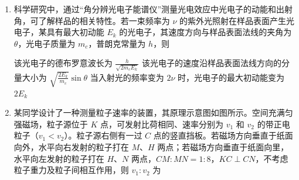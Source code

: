 \documentclass[\gkver]{gaokaozhenti}
\begin{document}
\begin{enumerate}
{已知光进入棱镜后垂直射到镜面 $MN$ 上，可得棱镜内的折射角：$r=90^{\circ}-60^{\circ}=30^{\circ}$

根据折射定律 $n=\frac{\sin i}{\sin r}$

代入数值：$n=\frac{\sin45^{\circ}}{\sin30^{\circ}}=\sqrt{2}$，故 AB 错误；

CD．全反射临界角 $C$ 满足 $\sin C=\frac{1}{n}$，代入得：$\sin C=\frac{1}{\sqrt{2}}\Rightarrow C=45^{\circ}$，故 C 正确，D 错误。

故选 C。
}
\item
科学研究中，通过“角分辨光电子能谱仪”测量光电效应中光电子的动能和出射角，可了解样品的相关特性。若一束频率为 $\nu$ 的紫外光照射在样品表面产生光电子，某具有最大初动能 $E_{k}$ 的光电子，其速度方向与样品表面法线的夹角为 $\theta$，光电子质量为 $m_{c}$，普朗克常量为 $h$，则 

{该光电子的德布罗意波长为 $\frac{h}{\sqrt{2m_{c}E_{k}}}$}
{该光电子的速度沿样品表面法线方向的分量大小为 $\sqrt{\frac{2E_{k}}{m_{c}}}\sin\theta$}
{当入射光的频率变为 $2\nu$ 时，光电子的最大初动能变为 $2E_{k}$}


\item
某同学设计了一种测量粒子速率的装置，其原理示意图如图所示。空间充满匀强磁场，粒子源位于 $K$ 点，可发射比荷相同、速率分别为 $v_{1}$ 和 $v_{2}$ 的带正电粒子（$v_{1}<v_{2}$）。粒子源右侧有一过 $C$ 点的竖直挡板。若磁场方向垂直于纸面向外，水平向右发射的粒子打在 $M$、$H$ 两点；若磁场方向垂直于纸面向里，水平向左发射的粒子打在 $H$、$N$ 两点，$CM:MN=1:8$，$KC\perp CN$，不考虑粒子重力及粒子间相互作用，则 $v_{1}:v_{2}$ 为 
\onepicture[h=5.20cm]{}


\end{enumerate}
\end{document}

